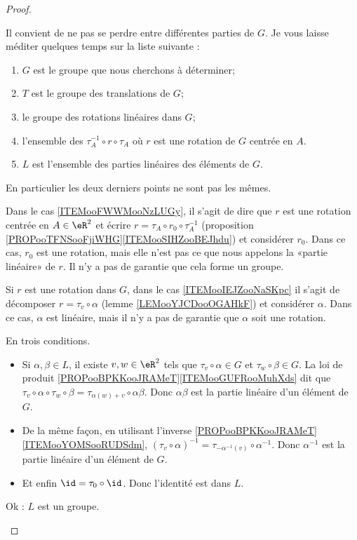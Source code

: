 \begin{proof}
	\begin{subproof}
		Il convient de ne pas se perdre entre différentes parties de \( G\). Je vous laisse méditer quelques temps sur la liste suivante :
		\begin{enumerate}
			\item \( G\) est le groupe que nous cherchons à déterminer;
			\item \( T\) est le groupe des translations de \( G\);
			\item le groupe des rotations linéaires dans \( G\);
			\item l'ensemble des \( \tau_A^{-1}\circ r\circ\tau_A\) où \( r\) est une rotation de \( G\) centrée en \( A\).     \label{ITEMooFWWMooNzLUGy}
			\item \( L\) est l'ensemble des parties linéaires des éléments de \( G\).      \label{ITEMooIEJZooNaSKpc}
		\end{enumerate}
		En particulier les deux derniers points ne sont pas les mêmes.

		Dans le cas \ref{ITEMooFWWMooNzLUGy}, il s'agit de dire que \( r\) est une rotation centrée en \( A\in \eR^2\) et écrire \( r=\tau_A\circ r_0\circ \tau_A^{-1}\) (proposition \ref{PROPooTFNSooFjiWHG}\ref{ITEMooSIHZooBEJhdu}) et considérer \( r_0\). Dans ce cas, \( r_0\) est une rotation, mais elle n'est pas ce que nous appelons la «partie linéaire» de \( r\). Il n'y a pas de garantie que cela forme un groupe.

		Si \( r\) est une rotation dans \( G\), dans le cas \ref{ITEMooIEJZooNaSKpc} il s'agit de décomposer \( r=\tau_v\circ\alpha\) (lemme \ref{LEMooYJCDooOGAHkF}) et considérer \( \alpha\). Dans ce cas, \( \alpha\) est linéaire, mais il n'y a pas de garantie que \( \alpha\) soit une rotation.

		En trois conditions.
		\begin{itemize}
			\item
			      Si \( \alpha,\beta\in L\), il existe \( v,w\in \eR^2\) tels que \( \tau_v\circ \alpha\in G\) et \( \tau_w\circ \beta\in G\). La loi de produit \ref{PROPooBPKKooJRAMeT}\ref{ITEMooGUFRooMuhXds} dit que \( \tau_v\circ \alpha\circ\tau_w\circ \beta=\tau_{\alpha(w)+v}\circ \alpha\beta\). Donc \( \alpha\beta\) est la partie linéaire d'un élément de \( G\).
			\item
			      De la même façon, en utilisant l'inverse \ref{PROPooBPKKooJRAMeT}\ref{ITEMooYOMSooRUDSdm}, \( (\tau_v\circ\alpha)^{-1}= \tau_{-\alpha^{-1}(v)}\circ \alpha^{-1}   \). Donc \( \alpha^{-1}\) est la partie linéaire d'un élément de \( G\).
			\item
			      Et enfin \( \id=\tau_0\circ \id\). Donc l'identité est dans \( L\).
		\end{itemize}
		Ok : \( L\) est un groupe.


\end{subproof}
\end{proof}
